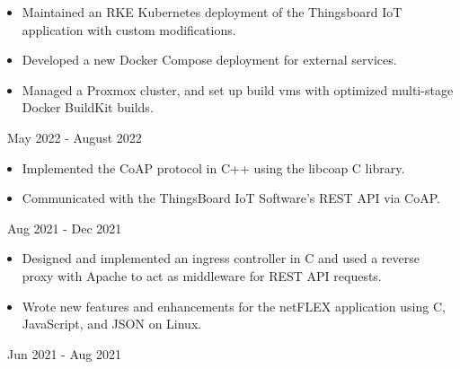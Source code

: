 \documentclass[11pt,letterpaper,ragged2e]{altacv}
\begin{document}

\hfuzz=5pt %

\begin{fullwidth}
  \makecvheader
\end{fullwidth}




{
  \begin{itemize}
    \item Maintained an RKE Kubernetes deployment of the Thingsboard IoT application with custom modifications.
    \item Developed a new Docker Compose deployment for external services.
    \item Managed a Proxmox cluster, and set up build vms with optimized multi-stage Docker BuildKit builds.
  \end{itemize}
}
{\faCalendar\, May 2022 - August 2022}
{
}

{
  \begin{itemize}
    \item Implemented the CoAP protocol in C++ using the libcoap C library.
    \item Communicated with the ThingsBoard IoT Software's REST API via CoAP.
  \end{itemize}
}
{\faCalendar\, Aug 2021 - Dec 2021}
{
}

{
  \begin{itemize}
    \item Designed and implemented an ingress controller in C and used a reverse proxy with Apache to act as middleware for REST API requests.
    \item Wrote new features and enhancements for the netFLEX application using C,  JavaScript, and JSON on Linux.
  \end{itemize}
}
{\faCalendar\, Jun 2021 - Aug 2021}
{
}
\end{document}
